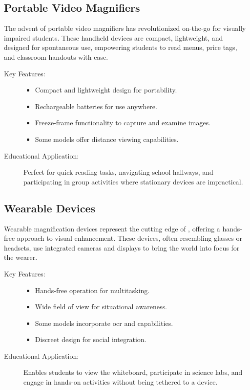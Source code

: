 \subsection{Portable Video Magnifiers}
The advent of portable video magnifiers has revolutionized on-the-go  for visually impaired students. These handheld devices are compact, lightweight, and designed for spontaneous use, empowering students to read menus, price tags, and classroom handouts with ease.\supercite{AFBMagnification}

\begin{description}
	\item[Key Features:]
	      \begin{itemize}
		      \item Compact and lightweight design for portability.
		      \item Rechargeable batteries for use anywhere.
		      \item Freeze-frame functionality to capture and examine images.
		      \item Some models offer distance viewing capabilities.
	      \end{itemize}
	\item[Educational Application:] Perfect for quick reading tasks, navigating school hallways, and participating in group activities where stationary devices are impractical.
\end{description}

\subsection{Wearable  Devices}
Wearable magnification devices represent the cutting edge of , offering a hands-free approach to visual enhancement. These devices, often resembling glasses or headsets, use integrated cameras and displays to bring the world into focus for the wearer.\supercite{envision, AFBMagnification}

\begin{description}
	\item[Key Features:]
	      \begin{itemize}
		      \item Hands-free operation for multitasking.
		      \item Wide field of view for situational awareness.
		      \item Some models incorporate \gls{ocr} and  capabilities.
		      \item Discreet design for social integration.
	      \end{itemize}
	\item[Educational Application:] Enables students to view the whiteboard, participate in science labs, and engage in hands-on activities without being tethered to a device.
\end{description}

